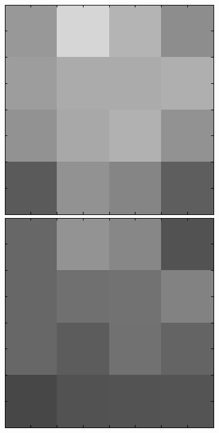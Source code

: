\begin{figure}[ht]
 \includegraphics[width=\textwidth*11/100]{ch5/figures/XM2VTS_2_3.png}
 \includegraphics[width=\textwidth*11/100]{ch5/figures/XM2VTS_3_3.png}

\end{figure}
